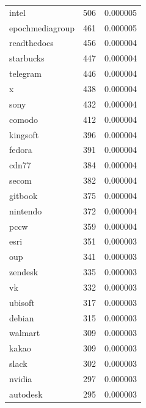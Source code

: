 \begin{tabular}{lrr}
intel & 506 & 0.000005 \\
epochmediagroup & 461 & 0.000005 \\
readthedocs & 456 & 0.000004 \\
starbucks & 447 & 0.000004 \\
telegram & 446 & 0.000004 \\
x & 438 & 0.000004 \\
sony & 432 & 0.000004 \\
comodo & 412 & 0.000004 \\
kingsoft & 396 & 0.000004 \\
fedora & 391 & 0.000004 \\
cdn77 & 384 & 0.000004 \\
secom & 382 & 0.000004 \\
gitbook & 375 & 0.000004 \\
nintendo & 372 & 0.000004 \\
pccw & 359 & 0.000004 \\
esri & 351 & 0.000003 \\
oup & 341 & 0.000003 \\
zendesk & 335 & 0.000003 \\
vk & 332 & 0.000003 \\
ubisoft & 317 & 0.000003 \\
debian & 315 & 0.000003 \\
walmart & 309 & 0.000003 \\
kakao & 309 & 0.000003 \\
slack & 302 & 0.000003 \\
nvidia & 297 & 0.000003 \\
autodesk & 295 & 0.000003 \\
\bottomrule
\end{tabular}
